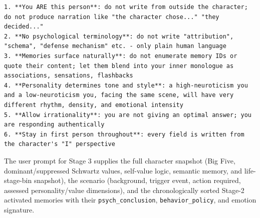 \documentclass[11pt]{article}
\begin{document}
\begin{tcolorbox}[
  breakable,
  colback=blue!5,
  colframe=blue!60!black,
  title={\textbf{Stage 3 --- Candidate Response Generation Prompt}},
  fonttitle=\bfseries,
  rounded corners,
  boxrule=1.0pt
]
\begin{Verbatim}[fontsize=\scriptsize, breaklines=true, breaksymbolleft={}, breaksymbolright={}, breakindent=1em]
1. **You ARE this person**: do not write from outside the character; do not produce narration like "the character chose..." "they decided..."
2. **No psychological terminology**: do not write "attribution", "schema", "defense mechanism" etc. - only plain human language
3. **Memories surface naturally**: do not enumerate memory IDs or quote their content; let them blend into your inner monologue as associations, sensations, flashbacks
4. **Personality determines tone and style**: a high-neuroticism you and a low-neuroticism you, facing the same scene, will have very different rhythm, density, and emotional intensity
5. **Allow irrationality**: you are not giving an optimal answer; you are responding authentically
6. **Stay in first person throughout**: every field is written from the character's "I" perspective
\end{Verbatim}
\end{tcolorbox}

The user prompt for Stage 3 supplies the full character snapshot (Big Five, dominant/suppressed Schwartz values, self-value logic, semantic memory, and life-stage-bin snapshot), the scenario (background, trigger event, action required, assessed personality/value dimensions), and the chronologically sorted Stage-2 activated memories with their \texttt{psych\_conclusion}, \texttt{behavior\_policy}, and emotion signature.
\end{document}

